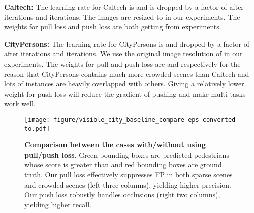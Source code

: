 \documentclass[sigconf]{acmart}
\begin{document}
\textbf{Caltech:}
The learning rate for Caltech is  and is dropped by a factor of  after  iterations and  iterations. The images are resized to  in our experiments. The weights for pull loss and push loss are both  getting from experiments.

\textbf{CityPersons:}
The learning rate for CityPersons is  and dropped by a factor of  after  iterations and  iterations. We use the original image resolution of  in our experiments. The weights for pull and push loss are  and  respectively for the reason that CityPersons contains much more crowded scenes than Caltech and lots of instances are heavily overlapped with others. Giving a relatively lower weight for push loss will reduce the gradient of pushing and make multi-tasks work well.

\begin{figure}[t]
\centering
\texttt{[image: figure/visible\_city\_baseline\_compare-eps-converted-to.pdf]}
\vspace{-2mm}
\caption{\textbf{Comparison between the cases with/without using pull/push loss}. Green bounding boxes are predicted pedestrians whose score is greater than  and red bounding boxes are ground truth. Our pull loss effectively suppresses FP in both sparse scenes and crowded scenes (left three columns), yielding higher precision. Our push loss  robustly handles occlusions (right two columns), yielding higher recall.}
\label{visible_city_baseline_compare}
\vspace{-2mm}
\end{figure}

\begin{table}[t]
\setlength{\abovecaptionskip}{2mm}
\setlength{\belowcaptionskip}{2mm}
\caption{\textbf{Comparison of our NMS-Ped with the baseline on CityPersons}.}
\vspace{-1mm}
\begin{center}
\end{center}
\vspace{-2mm}
\label{table_ablation_baseline_compare}
\end{table}
\end{document}
